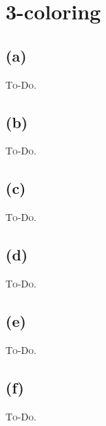 

\setcounter{section}{2}


\section{3-coloring}

\subsection{(a)}

\textsc{To-Do.}

\subsection{(b)}

\textsc{To-Do.}

\subsection{(c)}

\textsc{To-Do.}

\subsection{(d)}

\textsc{To-Do.}

\subsection{(e)}

\textsc{To-Do.}

\subsection{(f)}

\textsc{To-Do.}



